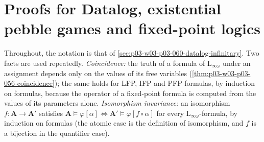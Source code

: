 \section{Proofs for Datalog, existential pebble games and fixed-point logics}
\label{sec:annex-p03-w03-p03-060}

Throughout, the notation is that of \cref{sec:p03-w03-p03-060-datalog-infinitary}.
Two facts are used repeatedly. \emph{Coincidence:} the truth of a formula
of \(\mathrm{L}_{\infty\omega}\) under an assignment depends only on the
values of its free variables (\cref{thm:p03-w03-p03-056-coincidence}); the
same holds for LFP, IFP and PFP formulas, by induction on formulas, because
the operator of a fixed-point formula is computed from the values of its
parameters alone. \emph{Isomorphism invariance:} an isomorphism
\(f\colon\mathbf A\to\mathbf A'\) satisfies
\(\mathbf A\models\varphi[\alpha]\iff\mathbf A'\models\varphi[f\circ\alpha]\)
for every \(\mathrm{L}_{\infty\omega}\)-formula, by induction on formulas
(the atomic case is the definition of isomorphism, and \(f\) is a
bijection in the quantifier case).

